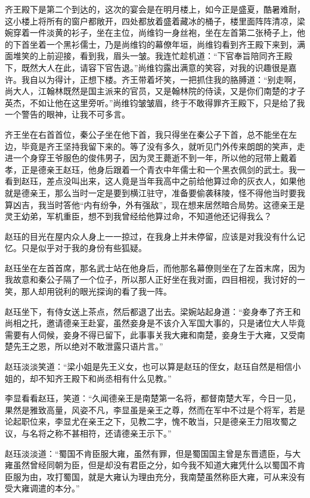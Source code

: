 齐王殿下是第二个到达的，这次的宴会是在明月楼上，如今正是盛夏，酷暑难耐，这小楼上将所有的窗户都敞开，四处都放着盛着藏冰的桶子，楼里面阵阵清凉，梁婉穿着一件淡黄的衫子，坐在主位，尚维钧一身丝袍，坐在左首第二张椅子上，他的下首坐着一个黑衫儒士，乃是尚维钧的幕僚年垣，尚维钧看到齐王殿下来到，满面堆笑的上前迎接，看到我，眉头一皱。我连忙趁机道：“下官奉旨陪同齐王殿下，既然大人在此，请容下官告退。”尚维钧露出满意的笑容，对我的识趣很是嘉许。我自以为得计，正想下楼。齐王带着坏笑，一把抓住我的胳膊道：“别走啊，尚大人，江翰林既然是国主派来的官员，又是翰林院的侍读，又是你们南楚的才子英杰，不如让他在这里旁听。”尚维钧皱皱眉，终于不敢得罪齐王殿下，只是给了我一个警告的眼神，让我不可多言。

齐王坐在右首首位，秦公子坐在他下首，我只得坐在秦公子下首，总不能坐在左边，毕竟是齐王坚持我留下来的。等了没有多久，就听见门外传来朗朗的笑声，走进一个身穿王爷服色的俊伟男子，因为灵王薨逝不到一年，所以他的冠带上戴着孝，正是德亲王赵珏，他身后跟着一个青衣中年儒士和一个黑衣佩剑的武士。我一看到赵珏，差点没叫出来，这人竟是当年我高中之前给他算过命的灰衣人，如果他就是德亲王，那么当时一定是要到横江驻守，准备要偷袭秣陵，怪不得他当时要我算凶吉，我当时答他“内有纷争，外有强敌”，现在想来居然暗合局势。这德亲王是灵王幼弟，军机重臣，想不到我曾经给他算过命，不知道他还记得我么？

赵珏的目光在屋内众人身上一一掠过，在我身上并未停留，应该是对我没有什么记忆。只是似乎对于我的身份有些狐疑。

赵珏坐在左首首席，那名武士站在他身后，而他那名幕僚则坐在了左首末席，因为我故意和秦公子隔了一个位子，所以那人正好坐在我对面，四目相视，我讨好的一笑，那人却用锐利的眼光探询的看了我一阵。

赵珏坐下，有侍女送上茶点，然后都退了出去。梁婉站起身道：“妾身奉了齐王和尚相之托，邀请德亲王赴宴，虽然妾身是不该介入军国大事的，只是诸位大人毕竟需要有人伺候，妾身不得已留下，此事事关我大雍和南楚，妾身生于大雍，又受南楚先王之恩，所以绝对不敢泄露只语片言。”

赵珏淡淡笑道：“梁小姐是先王义女，也可以算是赵珏的侄女，赵珏自然是相信小姐的，却不知齐王殿下和尚丞相有什么见教。”

李显看看赵珏，笑道：“久闻德亲王是南楚第一名将，都督南楚大军，今日一见，果然是雅致高量，风姿不凡，李显虽是亲王之尊，然而在军中不过是个将军，若是论起职位来，李显尤在亲王之下，见教二字，愧不敢当，只是德亲王力阻攻蜀之议，与名将之称不甚相符，还请德亲王示下。”

赵珏淡淡道：“蜀国不肯臣服大雍，虽然有罪，但是蜀国国主曾是东晋遗臣，与大雍虽然曾经同朝为臣，但是却没有君臣之分，如今我不知道大雍凭什么以蜀国不肯臣服为由，攻打蜀国，就是大雍认为理由充分，我南楚虽然称臣大雍，可从来没有受大雍调遣的本分。”

